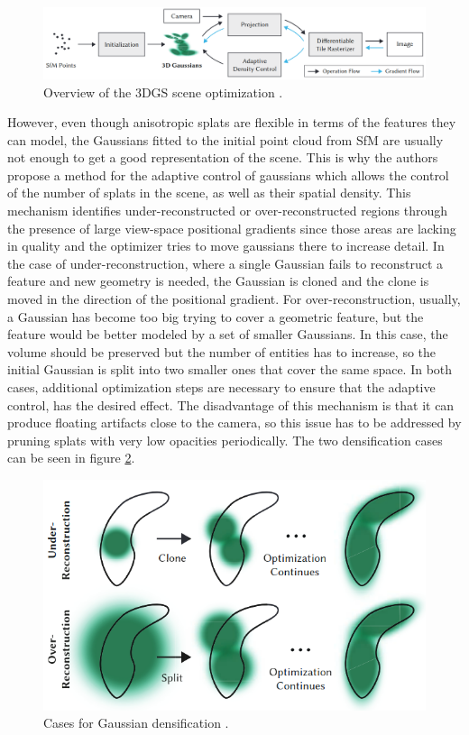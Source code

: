 \begin{figure}[H]
    \centering
    \includegraphics[width=0.7\linewidth]{figures/3dgs.png}
    \caption{Overview of the 3DGS scene optimization \cite{kerbl3Dgaussians}.}
    \label{fig:3dgspipeline}
\end{figure}

However, even though anisotropic splats are flexible in terms of the features they can model, the Gaussians fitted to the initial point cloud from SfM are usually not enough to get a good representation of the scene. This is why the authors propose a method for the adaptive control of gaussians which allows the control of the number of splats in the scene, as well as their spatial density. This mechanism identifies under-reconstructed or over-reconstructed regions through the presence of large view-space positional gradients since those areas are lacking in quality and the optimizer tries to move gaussians there to increase detail. In the case of under-reconstruction, where a single Gaussian fails to reconstruct a feature and new geometry is needed, the Gaussian is cloned and the clone is moved in the direction of the positional gradient. For over-reconstruction, usually, a Gaussian has become too big trying to cover a geometric feature, but the feature would be better modeled by a set of smaller Gaussians. In this case, the volume should be preserved but the number of entities has to increase, so the initial Gaussian is split into two smaller ones that cover the same space. In both cases, additional optimization steps are necessary to ensure that the adaptive control, has the desired effect. The disadvantage of this mechanism is that it can produce floating artifacts close to the camera, so this issue has to be addressed by pruning splats with very low opacities periodically. The two densification cases can be seen in figure \ref{fig:densification}.

\begin{figure}[H]
    \centering
    \includegraphics[width=0.6\linewidth]{figures/densification.png}
    \caption{Cases for Gaussian densification \cite{kerbl3Dgaussians}.}
    \label{fig:densification}
\end{figure}

